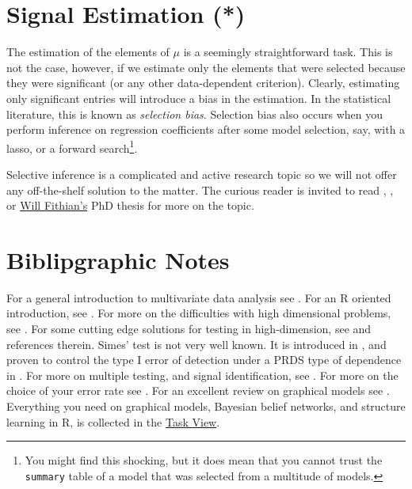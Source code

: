 \documentclass[]{book}
\theoremstyle{definition}
\theoremstyle{definition}
\theoremstyle{definition}
\theoremstyle{remark}
\begin{document}
\section{Signal Estimation (*)}\label{signal-estimation}

The estimation of the elements of \(\mu\) is a seemingly straightforward
task. This is not the case, however, if we estimate only the elements
that were selected because they were significant (or any other
data-dependent criterion). Clearly, estimating only significant entries
will introduce a bias in the estimation. In the statistical literature,
this is known as \emph{selection bias}. Selection bias also occurs when
you perform inference on regression coefficients after some model
selection, say, with a lasso, or a forward search\footnote{You might
  find this shocking, but it does mean that you cannot trust the
  \texttt{summary} table of a model that was selected from a multitude
  of models.}.

Selective inference is a complicated and active research topic so we
will not offer any off-the-shelf solution to the matter. The curious
reader is invited to read \citet{rosenblatt2014selective},
\citet{javanmard2014confidence}, or
\href{http://www.stat.berkeley.edu/~wfithian/}{Will Fithian's} PhD
thesis \citep{fithian2015topics} for more on the topic.

\section{Biblipgraphic Notes}\label{biblipgraphic-notes}

For a general introduction to multivariate data analysis see
\citet{anderson2004introduction}. For an R oriented introduction, see
\citet{everitt2011introduction}. For more on the difficulties with high
dimensional problems, see \citet{bai1996effect}. For some cutting edge
solutions for testing in high-dimension, see
\citet{rosenblatt2016better} and references therein. Simes' test is not
very well known. It is introduced in \citet{simes1986improved}, and
proven to control the type I error of detection under a PRDS type of
dependence in \citet{benjamini2001control}. For more on multiple
testing, and signal identification, see \citet{efron2012large}. For more
on the choice of your error rate see \citet{rosenblatt2013practitioner}.
For an excellent review on graphical models see
\citet{kalisch2014causal}. Everything you need on graphical models,
Bayesian belief networks, and structure learning in R, is collected in
the \href{https://cran.r-project.org/web/views/gR.html}{Task View}.
\end{document}
